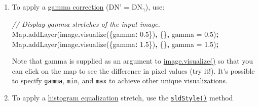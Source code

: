 \documentclass[
]{article}
\newenvironment{Shaded}{\begin{snugshade}}{\end{snugshade}}
\newcommand{\BuiltInTok}[1]{#1}
\newcommand{\CommentTok}[1]{\textcolor[rgb]{0.56,0.35,0.01}{\textit{#1}}}
\newcommand{\DataTypeTok}[1]{\textcolor[rgb]{0.13,0.29,0.53}{#1}}
\newcommand{\FloatTok}[1]{\textcolor[rgb]{0.00,0.00,0.81}{#1}}
\newcommand{\FunctionTok}[1]{\textcolor[rgb]{0.00,0.00,0.00}{#1}}
\newcommand{\NormalTok}[1]{#1}
\newcommand{\OperatorTok}[1]{\textcolor[rgb]{0.81,0.36,0.00}{\textbf{#1}}}
\newcommand{\StringTok}[1]{\textcolor[rgb]{0.31,0.60,0.02}{#1}}
\begin{document}
\begin{enumerate}
\def\labelenumi{\arabic{enumi}.}
\item
  To apply a \href{https://en.wikipedia.org/wiki/Gamma_correction}{gamma correction} (DN' = DN\(_\gamma\)), use:

\begin{Shaded}
\begin{Highlighting}[]
\CommentTok{// Display gamma stretches of the input image.}
\BuiltInTok{Map}\OperatorTok{.}\FunctionTok{addLayer}\NormalTok{(image}\OperatorTok{.}\FunctionTok{visualize}\NormalTok{(\{}\DataTypeTok{gamma}\OperatorTok{:} \FloatTok{0.5}\NormalTok{\})}\OperatorTok{,}\NormalTok{ \{\}}\OperatorTok{,} \StringTok{\textquotesingle{}gamma = 0.5\textquotesingle{}}\NormalTok{)}\OperatorTok{;}
\BuiltInTok{Map}\OperatorTok{.}\FunctionTok{addLayer}\NormalTok{(image}\OperatorTok{.}\FunctionTok{visualize}\NormalTok{(\{}\DataTypeTok{gamma}\OperatorTok{:} \FloatTok{1.5}\NormalTok{\})}\OperatorTok{,}\NormalTok{ \{\}}\OperatorTok{,} \StringTok{\textquotesingle{}gamma = 1.5\textquotesingle{}}\NormalTok{)}\OperatorTok{;}
\end{Highlighting}
\end{Shaded}

  Note that gamma is supplied as an argument to \href{https://developers.google.com/earth-engine/apidocs/ee-image-visualize}{image.visualize()} so that you can click on the map to see the difference in pixel values (try it!). It's possible to specify \texttt{gamma}, \texttt{min}, and \texttt{max} to achieve other unique visualizations.
\item
  To apply a \href{https://en.wikipedia.org/wiki/Histogram_equalization}{histogram equalization} stretch, use the \href{https://devsite.googleplex.com/earth-engine/image_visualization\#styled-layer-descriptors}{\texttt{sldStyle()}} method


\end{enumerate}
\end{document}
